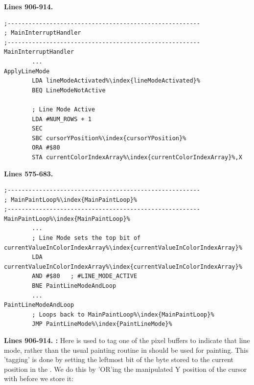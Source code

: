 \textbf{Lines 906-914. } 
\begin{lstlisting}[caption=From \icode{MainInterruptHandler}.,escapechar=\%]
;-------------------------------------------------------
; MainInterruptHandler
;-------------------------------------------------------
MainInterruptHandler
        ...
ApplyLineMode
        LDA lineModeActivated%\index{lineModeActivated}%
        BEQ LineModeNotActive

        ; Line Mode Active
        LDA #NUM_ROWS + 1
        SEC 
        SBC cursorYPosition%\index{cursorYPosition}%
        ORA #$80
        STA currentColorIndexArray%\index{currentColorIndexArray}%,X
\end{lstlisting}

\textbf{Lines 575-683. } 
\begin{lstlisting}[caption=From \icode{MainPaintLoop\index{MainPaintLoop}}.,escapechar=\%]
;-------------------------------------------------------
; MainPaintLoop%\index{MainPaintLoop}%
;-------------------------------------------------------
MainPaintLoop%\index{MainPaintLoop}%    
        ...
        ; Line Mode sets the top bit of currentValueInColorIndexArray%\index{currentValueInColorIndexArray}%
        LDA currentValueInColorIndexArray%\index{currentValueInColorIndexArray}%
        AND #$80   ; #LINE_MODE_ACTIVE
        BNE PaintLineModeAndLoop
        ...
PaintLineModeAndLoop
        ; Loops back to MainPaintLoop%\index{MainPaintLoop}%
        JMP PaintLineMode%\index{PaintLineMode}%
\end{lstlisting}
\clearpage
\textbf{Lines 906-914. :} Here  is used
to tag one of the pixel buffers to indicate that line mode, rather than the usual painting routine
in  should be used for painting. This 'tagging'
is done by setting the leftmost bit of the byte stored to the current position in the 
. We do this by 'OR'ing the manipulated Y position of the cursor
with  before we store it:

